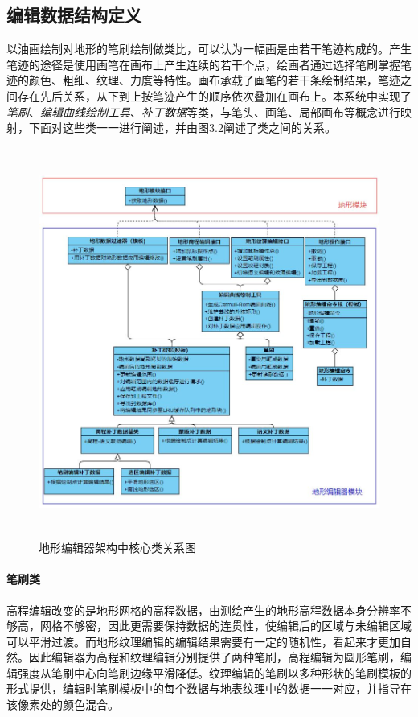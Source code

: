 \subsection{编辑数据结构定义}
以油画绘制对地形的笔刷绘制做类比，可以认为一幅画是由若干笔迹构成的。产生笔迹的途径是使用画笔在画布上产生连续的若干个点，绘画者通过选择笔刷掌握笔迹的颜色、粗细、纹理、力度等特性。画布承载了画笔的若干条绘制结果，笔迹之间存在先后关系，从下到上按笔迹产生的顺序依次叠加在画布上。本系统中实现了\textit{笔刷}、\textit{编辑曲线绘制工具}、\textit{补丁数据}等类，与笔头、画笔、局部画布等概念进行映射，下面对这些类一一进行阐述，并由图3.2阐述了类之间的关系。\par
\begin{figure}[htb]
\centering
\includegraphics[height=12.8cm,width=12.5cm]{figures/structure2.JPG}
\caption{地形编辑器架构中核心类关系图}
\end{figure}
\paragraph{笔刷类}
高程编辑改变的是地形网格的高程数据，由测绘产生的地形高程数据本身分辨率不够高，网格不够密，因此更需要保持数据的连贯性，使编辑后的区域与未编辑区域可以平滑过渡。而地形纹理编辑的编辑结果需要有一定的随机性，看起来才更加自然。因此编辑器为高程和纹理编辑分别提供了两种笔刷，高程编辑为圆形笔刷，编辑强度从笔刷中心向笔刷边缘平滑降低。纹理编辑的笔刷以多种形状的笔刷模板的形式提供，编辑时笔刷模板中的每个数据与地表纹理中的数据一一对应，并指导在该像素处的颜色混合。
